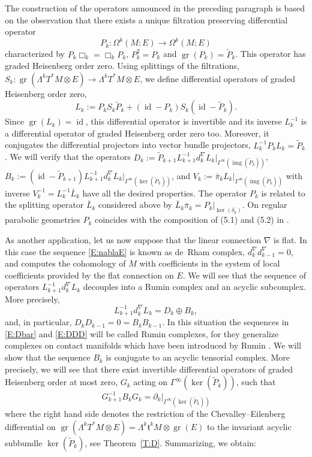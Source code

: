 \documentclass[reqno,12pt]{amsart}
\DeclareMathOperator{\img}{img}
\DeclareMathOperator{\gr}{gr}
\DeclareMathOperator{\id}{id}
\theoremstyle{plain}
\theoremstyle{definition}
\begin{document}
The construction of the operators announced in the preceding paragraph is based on the observation that there exists a unique filtration preserving differential operator
$$
P_k\colon\Omega^k(M;E)\to\Omega^k(M;E)
$$ 
characterized by $P_k\Box_k=\Box_kP_k$, $P_k^2=P_k$ and $\gr(P_k)=\tilde P_k$.
This operator has graded Heisenberg order zero.
Using splittings of the filtrations, $S_k\colon\gr(\Lambda^kT^*M\otimes E)\to\Lambda^kT^*M\otimes E$, we define differential operators of graded Heisenberg order zero, 
$$
L_k:=P_kS_k\tilde P_k+(\id-P_k)S_k(\id-\tilde P_k).
$$
Since $\gr(L_k)=\id$, this differential operator is invertible and its inverse $L^{-1}_k$ is a differential operator of graded Heisenberg order zero too.
Moreover, it conjugates the differential projectors into vector bundle projectors, $L^{-1}_kP_kL_k=\tilde P_k$.
We will verify that the operators $D_k:=\tilde P_{k+1}L_{k+1}^{-1}d^\nabla_kL_k|_{\Gamma^\infty(\img(\tilde P_k))}$, $B_k:=(\id-\tilde P_{k+1})L_{k+1}^{-1}d^\nabla_kL_k|_{\Gamma^\infty(\ker(\tilde P_k))}$, and $V_k:=\bar\pi_kL_k|_{\Gamma^\infty(\img(\tilde P_k))}$ with inverse $V_k^{-1}=L_k^{-1}\bar L_k$ have all the desired properties.
The operator $P_k$ is related to the splitting operator $\bar L_k$ considered above by $\bar L_k\bar\pi_k=P_k|_{\ker(\delta_k)}$.
On regular parabolic geometries $P_k$ coincides with the composition of (5.1) and (5.2) in \cite{CD01}.


As another application, let us now suppose that the linear connection $\nabla$ is flat.
In this case the sequence \eqref{E:nablaE} is known as de~Rham complex, $d^\nabla_kd^\nabla_{k-1}=0$, and computes the cohomology of $M$ with coefficients in the system of local coefficients provided by the flat connection on $E$.
We will see that the sequence of operators $L_{k+1}^{-1}d^\nabla_kL_k$ decouples into a Rumin complex and an acyclic subcomplex.
More precisely, 
$$
L_{k+1}^{-1}d^\nabla_kL_k=D_k\oplus B_k,
$$
and, in particular, $D_kD_{k-1}=0=B_kB_{k-1}$.
In this situation the sequences in \eqref{E:Dbar} and \eqref{E:DDD} will be called Rumin complexes, for they generalize complexes on contact manifolds which have been introduced by Rumin \cite{R00}.
We will show that the sequence $B_k$ is conjugate to an acyclic tensorial complex.
More precisely, we will see that there exist invertible differential operators of graded Heisenberg order at most zero, $G_k$ acting on $\Gamma^\infty(\ker(\tilde P_k))$, such that 
$$
G_{k+1}^{-1}B_kG_k=\partial_k|_{\Gamma^\infty(\ker(\tilde P_k))}
$$ 
where the right hand side denotes the restriction of the Chevalley--Eilenberg differential on $\gr(\Lambda^kT^*M\otimes E)=\Lambda^k\mathfrak t^kM\otimes\gr(E)$ to the invariant acyclic subbundle $\ker(\tilde P_k)$, see Theorem~\ref{T:D}.
Summarizing, we obtain:
\end{document}
